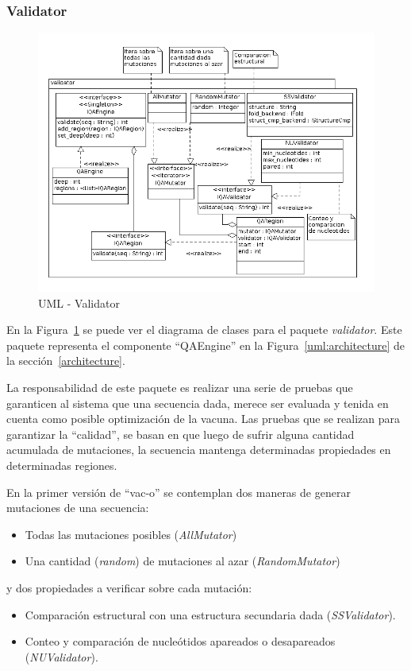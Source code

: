   \subsubsection{Validator}
    \begin{figure}
      \centering
      \includegraphics[scale=0.5]{lld-validator.png}  
      \caption{UML - Validator}
      \label{uml:lld-validator}
    \end{figure}

  En la Figura~\ref{uml:lld-validator} se puede ver el diagrama de clases
para el paquete \textit{validator}. Este paquete representa el componente
``QAEngine'' en la Figura~\ref{uml:architecture} de la
secci\'on~\ref{architecture}.

  La responsabilidad de este paquete es realizar una serie de pruebas que
garanticen al sistema que una secuencia dada, merece ser evaluada y tenida en
cuenta como posible optimizaci\'on de la vacuna. Las pruebas que se realizan
para garantizar la ``calidad'', se basan en que luego de sufrir alguna cantidad
acumulada de mutaciones, la secuencia mantenga determinadas propiedades en
determinadas regiones.

  En la primer versi\'on de ``vac-o'' se contemplan dos maneras de generar
mutaciones de una secuencia:
    \begin{itemize}
     \item Todas las mutaciones posibles (\textit{AllMutator})
     \item Una cantidad (\textit{random}) de mutaciones al azar
(\textit{RandomMutator})
    \end{itemize}
y dos propiedades a verificar sobre cada mutaci\'on:
    \begin{itemize}
     \item Comparaci\'on estructural con una estructura secundaria dada
(\textit{SSValidator}).
     \item Conteo y comparaci\'on de nucle\'otidos apareados o desapareados
(\textit{NUValidator}).
    \end{itemize}

